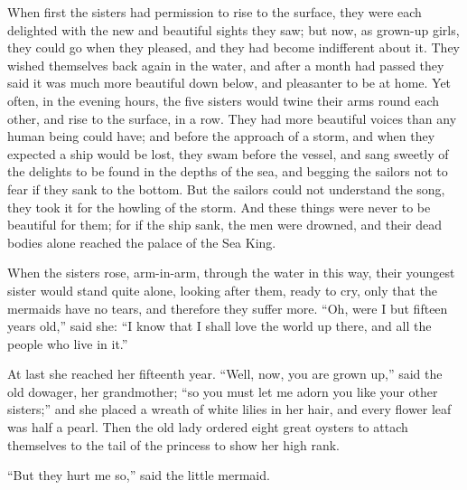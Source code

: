 When first the sisters had permission to rise to the surface, they were each delighted with the new and beautiful sights they saw; but now, as grown-up girls, they could go when they pleased, and they had become indifferent about it.
They wished themselves back again in the water, and after a month had passed they said it was much more beautiful down below, and pleasanter to be at home.
Yet often, in the evening hours, the five sisters would twine their arms round each other, and rise to the surface, in a row.
They had more beautiful voices than any human being could have; and before the approach of a storm, and when they expected a ship would be lost, they swam before the vessel, and sang sweetly of the delights to be found in the depths of the sea, and begging the sailors not to fear if they sank to the bottom.
But the sailors could not understand the song, they took it for the howling of the storm.
And these things were never to be beautiful for them; for if the ship sank, the men were drowned, and their dead bodies alone reached the palace of the Sea King.

When the sisters rose, arm-in-arm, through the water in this way, their youngest sister would stand quite alone, looking after them, ready to cry, only that the mermaids have no tears, and therefore they suffer more.
``Oh, were I but fifteen years old,'' said she: ``I know that I shall love the world up there, and all the people who live in it.''

At last she reached her fifteenth year.
``Well, now, you are grown up,'' said the old dowager, her grandmother; ``so you must let me adorn you like your other sisters;'' and she placed a wreath of white lilies in her hair, and every flower leaf was half a pearl.
Then the old lady ordered eight great oysters to attach themselves to the tail of the princess to show her high rank.

``But they hurt me so,'' said the little mermaid.

